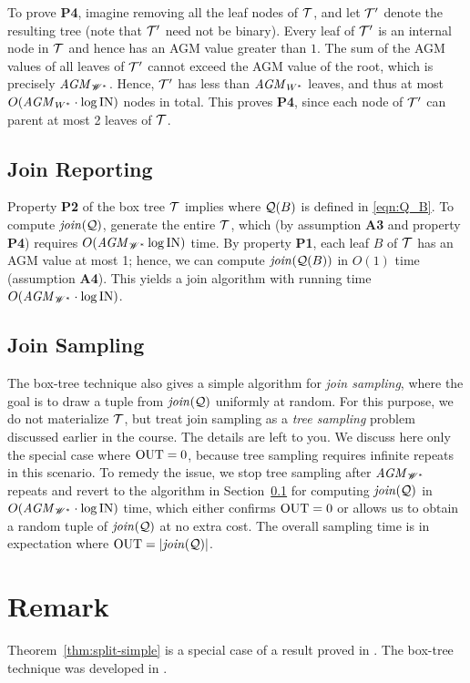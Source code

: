 \vgap

To prove {\bf P4}, imagine removing all the leaf nodes of $\mathcal{T}$, and let $\mathcal{T}'$ denote the resulting tree (note that $\mathcal{T}'$ need not be binary). Every leaf of $\mathcal{T}'$ is an internal node in $\mathcal{T}$ and hence has an AGM value greater than $1$. The sum of the AGM values of all leaves of $\mathcal{T}'$ cannot exceed the AGM value of the root, which is precisely $\mathit{AGM}_{\mathscr{W}^*}$. Hence, $\mathcal{T}'$ has less than $\mathit{AGM}_{W^*}$ leaves, and thus at most $O(\mathit{AGM}_{W^*} \cdot \log \mathrm{IN})$ nodes in total. This proves {\bf P4}, since each node of $\mathcal{T}'$ can parent at most 2 leaves of $\mathcal{T}$.

\subsection{Join Reporting} \label{sec:boxtree:report}

Property {\bf P2} of the box tree $\mathcal{T}$ implies
where $\mathcal{Q}(B)$ is defined in \eqref{eqn:Q_B}. To compute $\mathit{join}(\mathcal{Q})$, generate the entire $\mathcal{T}$, which (by assumption {\bf A3} and property {\bf P4}) requires $O(\mathit{AGM}_{\mathscr{W}^*} \log \mathrm{IN})$  time. By property {\bf P1}, each leaf $B$ of $\mathcal{T}$ has an AGM value at most 1; hence, we can compute $\mathit{join}(\mathcal{Q}(B))$ in $O(1)$ time (assumption {\bf A4}). This yields a join algorithm with running time $O(\mathit{AGM}_{\mathscr{W}^*} \cdot \log \mathrm{IN})$.

\subsection{Join Sampling} \label{sec:boxtree:sample}

The box-tree technique also gives a simple algorithm for {\em join sampling}, where the goal is to draw a tuple from $\mathit{join}(\mathcal{Q})$ uniformly at random. For this purpose, we do not materialize $\mathcal{T}$, but treat join sampling as a {\em tree sampling} problem discussed earlier in the course. The details are left to you. We discuss here only the special case where $\mathrm{OUT} = 0$, because  tree sampling requires infinite repeats in this scenario. To remedy the issue, we stop tree sampling after $\mathit{AGM}_{\mathscr{W}^*}$ repeats and revert to the algorithm in Section~\ref{sec:boxtree:report} for computing $\mathit{join}(\mathcal{Q})$ in $O(\mathit{AGM}_{\mathscr{W}^*} \cdot \log \mathrm{IN})$ time, which either confirms $\mathrm{OUT} = 0$ or allows us to obtain a random tuple of $\mathit{join}(\mathcal{Q})$ at no extra cost. The overall sampling time is
in expectation where $\mathrm{OUT} = |\mathit{join}(\mathcal{Q})|$.


\section{Remark}

Theorem~\ref{thm:split-simple} is a special case of a result proved in \cite{tw25}. The box-tree technique was developed in  \cite{dlt23}.






